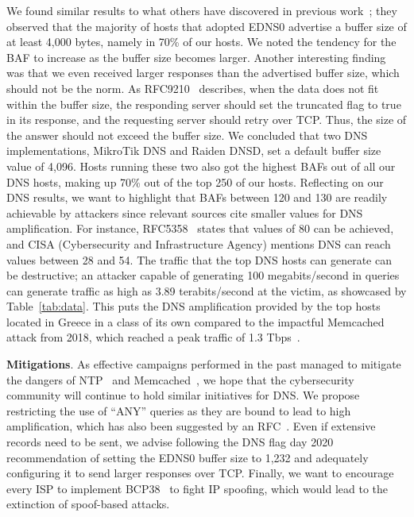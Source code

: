  We found similar results to what others have discovered in previous work~\cite{van_rijswijk-deij_dnssec_2014}; they observed that the majority of hosts that adopted EDNS0 advertise a buffer size of at least 4,000 bytes, namely in 70\% of our hosts. We noted the tendency for the BAF to increase as the buffer size becomes larger. Another interesting finding was that we even received larger responses than the advertised buffer size, which should not be the norm. As RFC9210~\cite{rfc9210} describes, when the data does not fit within the buffer size, the responding server should set the truncated flag to true in its response, and the requesting server should retry over TCP. Thus, the size of the answer should not exceed the buffer size. We concluded that two DNS implementations, MikroTik DNS and Raiden DNSD, set a default buffer size value of 4,096. Hosts running these two also got the highest BAFs out of all our DNS hosts, making up 70\% out of the top 250 of our hosts. Reflecting on our DNS results, we want to highlight that BAFs between 120 and 130 are readily achievable by attackers since relevant sources cite smaller values for DNS amplification. For instance, RFC5358~\cite{rfc-5358} states that values of 80 can be achieved, and CISA (Cybersecurity and Infrastructure Agency) mentions DNS can reach values between 28 and 54. The traffic that the top DNS hosts can generate can be destructive; an attacker capable of generating 100 megabits/second in queries can generate traffic as high as 3.89 terabits/second at the victim, as showcased by Table~\ref{tab:data}. This puts the DNS amplification provided by the top hosts located in Greece in a class of its own compared to the impactful Memcached attack from 2018, which reached a peak traffic of 1.3 Tbps~\cite{akamai2018attackspotlight}.  


\textbf{Mitigations}. As effective campaigns performed in the past managed to mitigate the dangers of NTP~\cite{exit_hell} and Memcached~\cite{akamai2018attackspotlight}, we hope that the cybersecurity community will continue to hold similar initiatives for DNS. We propose restricting the use of ``ANY'' queries as they are bound to lead to high amplification, which has also been suggested by an RFC~\cite{rfc-8482}. Even if extensive records need to be sent, we advise following the DNS flag day 2020 recommendation of setting the EDNS0 buffer size to 1,232 and adequately configuring it to send larger responses over TCP. Finally, we want to encourage every ISP to implement BCP38~\cite{ferguson-2000} to fight IP spoofing, which would lead to the extinction of spoof-based attacks. 

